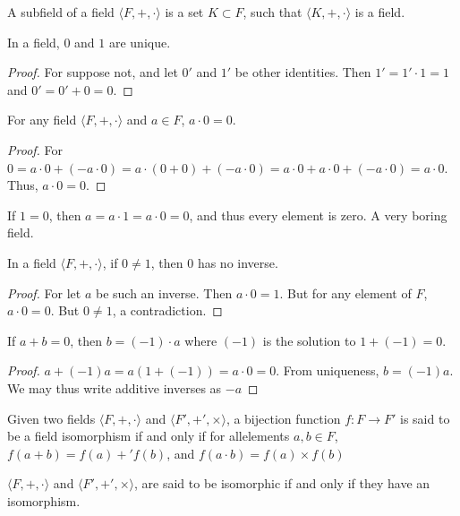     \begin{definition}
    A subfield of a field $\langle F,+,\cdot \rangle$ is a set $K\subset F$, such that $\langle K, +,\cdot \rangle$ is a field.
    \end{definition}
    \begin{theorem}
    In a field, $0$ and $1$ are unique.
    \end{theorem}
    \begin{proof}
    For suppose not, and let $0'$ and $1'$ be other identities. Then $1'=1'\cdot 1 = 1$ and $0'=0'+0=0$.
    \end{proof}
    \begin{theorem}
    For any field $\langle{F},+,\cdot\rangle$ and $a\in{F}$,
    $a\cdot{0}=0$.
    \end{theorem}
    \begin{proof}
    For $0=a\cdot{0}+(-a\cdot 0)=a\cdot(0+0)+(-a\cdot 0)=a\cdot{0}+a\cdot 0 + (-a\cdot 0) = a\cdot 0$. Thus, $a\cdot 0 = 0$.
    \end{proof}
    If $1=0$, then $a=a\cdot{1}=a\cdot{0}=0$, and thus every element is
    zero. A very boring field.
    \begin{theorem}
        In a field $\langle F, +,\cdot \rangle$, if $0\ne 1$, then $0$
        has no inverse.
    \end{theorem}
    \begin{proof}
    For let $a$ be such an inverse. Then $a\cdot 0 = 1$. But for any element of $F$, $a \cdot 0 = 0$. But $0\ne 1$, a contradiction.
    \end{proof}
    \begin{theorem}
    If $a+b = 0$, then $b= (-1)\cdot a$ where $(-1)$ is the solution to $1+(-1)=0$.
    \end{theorem}
    \begin{proof}
    $a+(-1)a = a(1+(-1)) = a\cdot 0 = 0$. From uniqueness, $b=(-1)a$. We may thus write additive inverses as $-a$
    \end{proof}
    \begin{definition}
    Given two fields $\langle F,+,\cdot \rangle$ and $\langle F', +',\times \rangle$, a bijection function $f:F\rightarrow F'$ is said to be a field isomorphism if and only if for allelements $a,b\in F$, $f(a+b)=f(a)+'f(b)$, and $f(a\cdot b) = f(a)\times f(b)$
    \end{definition}
    \begin{definition}
    $\langle F,+,\cdot \rangle$ and $\langle F', +',\times \rangle$, are said to be isomorphic if and only if they have an isomorphism.
    \end{definition}
